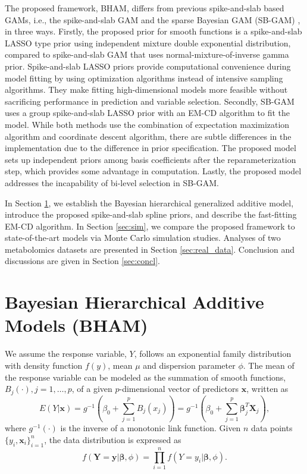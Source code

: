 \documentclass[AMA,STIX1COL,]{WileyNJD-v2}
\begin{document}
The proposed framework, BHAM, differs from previous spike-and-slab based
GAMs, i.e., the spike-and-slab GAM \citep{Scheipl2012} and the sparse
Bayesian GAM (SB-GAM) \citep{Bai2021}, in three ways. Firstly, the
proposed prior for smooth functions is a spike-and-slab LASSO type prior
using independent mixture double exponential distribution, compared to
spike-and-slab GAM that uses normal-mixture-of-inverse gamma prior.
Spike-and-slab LASSO priors provide computational convenience during
model fitting by using optimization algorithms instead of intensive
sampling algorithms. They make fitting high-dimensional models more
feasible without sacrificing performance in prediction and variable
selection. Secondly, SB-GAM uses a group spike-and-slab LASSO prior with
an EM-CD algorithm to fit the model. While both methods use the
combination of expectation maximization algorithm and coordinate descent
algorithm, there are subtle differences in the implementation due to the
difference in prior specification. The proposed model sets up
independent priors among basis coefficients after the reparameterization
step, which provides some advantage in computation. Lastly, the proposed
model addresses the incapability of bi-level selection in SB-GAM.

In Section \ref{sec:BHAM}, we establish the Bayesian hierarchical
generalized additive model, introduce the proposed spike-and-slab spline
priors, and describe the fast-fitting EM-CD algorithm. In Section
\ref{sec:sim}, we compare the proposed framework to state-of-the-art
models via Monte Carlo simulation studies. Analyses of two metabolomics
datasets are presented in Section \ref{sec:real_data}. Conclusion and
discussions are given in Section \ref{sec:concl}.

\section{Bayesian Hierarchical Additive Models (BHAM)}
\label{sec:BHAM}

We assume the response variable, \(Y\), follows an exponential family
distribution with density function \(f(y)\), mean \(\mu\) and dispersion
parameter \(\phi\). The mean of the response variable can be modeled as
the summation of smooth functions, \(B_j(\cdot), j = 1, \dots, p\), of a
given \(p\)-dimensional vector of predictors \(\boldsymbol{x}\), written
as \begin{equation}\label{eq:gam}
 E(Y|\boldsymbol{x}) = g^{-1}(\beta_0 + \sum\limits^p_{j=1}B_j(x_j)) = g^{-1}(\beta_0 + \sum\limits^p_{j=1} \boldsymbol{\beta}_j^T \boldsymbol{X}_j),
\end{equation} where \(g^{-1}(\cdot)\) is the inverse of a monotonic
link function. Given \(n\) data points
\(\{y_i, \boldsymbol{x}_i\}^n_{i=1}\), the data distribution is
expressed as \begin{equation}
f(\boldsymbol{Y} = \boldsymbol{y}| \boldsymbol{\beta}, \phi) = \prod\limits^n_{i=1}f( Y = y_i|\boldsymbol{\beta}, \phi).\nonumber
\end{equation}
\end{document}
